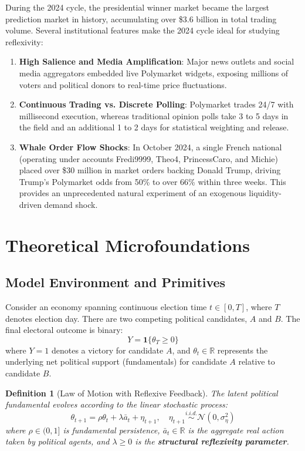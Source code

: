 \documentclass[12pt]{article}
\newtheorem{definition}{Definition}
\begin{document}
During the 2024 cycle, the presidential winner market became the largest prediction market in history, accumulating over \$3.6 billion in total trading volume. Several institutional features make the 2024 cycle ideal for studying reflexivity:
\begin{enumerate}
    \item \textbf{High Salience and Media Amplification}: Major news outlets and social media aggregators embedded live Polymarket widgets, exposing millions of voters and political donors to real-time price fluctuations.
    \item \textbf{Continuous Trading vs. Discrete Polling}: Polymarket trades 24/7 with millisecond execution, whereas traditional opinion polls take 3 to 5 days in the field and an additional 1 to 2 days for statistical weighting and release.
    \item \textbf{Whale Order Flow Shocks}: In October 2024, a single French national (operating under accounts Fredi9999, Theo4, PrincessCaro, and Michie) placed over \$30 million in market orders backing Donald Trump, driving Trump's Polymarket odds from 50\% to over 66\% within three weeks. This provides an unprecedented natural experiment of an exogenous liquidity-driven demand shock.
\end{enumerate}

\section{Theoretical Microfoundations}

\subsection{Model Environment and Primitives}
Consider an economy spanning continuous election time $t \in [0, T]$, where $T$ denotes election day. There are two competing political candidates, $A$ and $B$. The final electoral outcome is binary:
\begin{equation}
Y = \mathbf{1}\{\theta_T \ge 0\}
\end{equation}
where $Y=1$ denotes a victory for candidate $A$, and $\theta_t \in \mathbb{R}$ represents the underlying net political support (fundamentals) for candidate $A$ relative to candidate $B$.

\begin{definition}[Law of Motion with Reflexive Feedback]
The latent political fundamental evolves according to the linear stochastic process:
\begin{equation}
\theta_{t+1} = \rho \theta_t + \lambda \bar{a}_t + \eta_{t+1}, \quad \eta_{t+1} \overset{i.i.d.}{\sim} \mathcal{N}(0, \sigma_\eta^2)
\end{equation}
where $\rho \in (0, 1]$ is fundamental persistence, $\bar{a}_t \in \mathbb{R}$ is the aggregate real action taken by political agents, and $\lambda \ge 0$ is the \textbf{structural reflexivity parameter}.
\end{definition}
\end{document}
